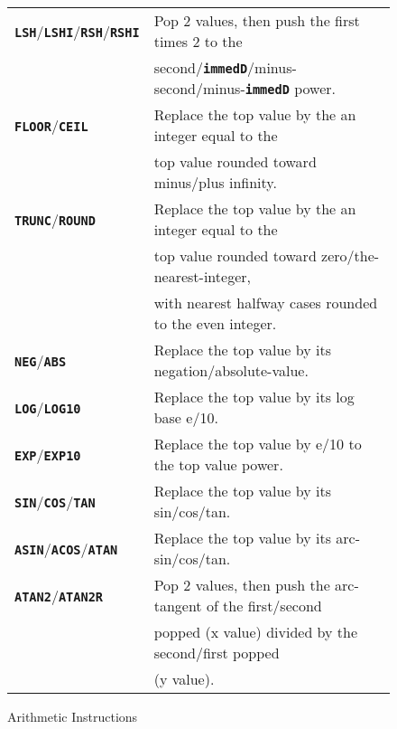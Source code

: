 \documentclass[12pt]{article}
\makeatletter
\newcommand{\TT}[1]{{\tt \bfseries #1}}
\newcommand{\ttkey}[1]{\TT{#1}\index{#1@{\tt #1}}}
\newlength{\figurewidth}
\newenvironment{boxedfigure}[1][!btp]%
	{\begin{figure*}[#1]
	 \begin{lrbox}{\figurebox}
	 \begin{minipage}{\figurewidth}

	 \vspace*{1ex}}%
	{
	 \vspace*{1ex}

	 \end{minipage}
	 \end{lrbox}

	 \centering
	 \fbox{\hspace*{0.1in}\usebox{\figurebox}\hspace*{0.1in}}
	 \end{figure*}}
\makeatother
\begin{document}
\begin{boxedfigure}[p!]
\begin{center}
\begin{tabular}{|l|l|}
\\\hline
\ttkey{LSH}/\ttkey{LSHI}/\ttkey{RSH}/\ttkey{RSHI}
    & Pop 2 values, then push the first times 2 to the \\
    & second/\TT{immedD}/minus-second/minus-\TT{immedD} power.
\\\hline
\ttkey{FLOOR}/\ttkey{CEIL}
    & Replace the top value by the an integer equal to the \\
    & top value rounded toward minus/plus infinity.
\\\hline
\ttkey{TRUNC}/\ttkey{ROUND}
    & Replace the top value by the an integer equal to the \\
    & top value rounded toward zero/the-nearest-integer, \\
    & with nearest halfway cases rounded to the even integer.
\\\hline
\ttkey{NEG}/\ttkey{ABS}
    & Replace the top value by its negation/absolute-value.
\\\hline
\ttkey{LOG}/\ttkey{LOG10}
    & Replace the top value by its log base e/10.
\\\hline
\ttkey{EXP}/\ttkey{EXP10}
    & Replace the top value by e/10 to the top value power.
\\\hline
\ttkey{SIN}/\ttkey{COS}/\ttkey{TAN}
    & Replace the top value by its sin/cos/tan.
\\\hline
\ttkey{ASIN}/\ttkey{ACOS}/\ttkey{ATAN}
    & Replace the top value by its arc- sin/cos/tan.
\\\hline
\ttkey{ATAN2}/\ttkey{ATAN2R}
    & Pop 2 values, then push the arc-tangent of the first/second \\
    & popped (x value) divided by the second/first popped \\
    & (y value).
\\\hline
\end{tabular}
\end{center}
\caption{Arithmetic Instructions}
\label{ARITHMETIC-INSTRUCTIONS}
\end{boxedfigure}

\pagebreak
\end{document}
